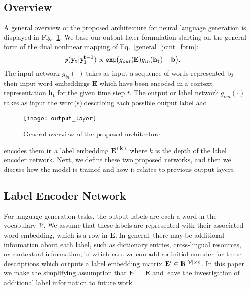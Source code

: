 \documentclass{article}
\begin{document}
\subsection{Overview}
A general overview of the proposed architecture for neural language generation is displayed in Fig.~\ref{drill_schema}.
We base our output layer formulation starting on the general form of the dual nonlinear mapping of Eq.~\ref{general_joint_form}:
\begin{align}
    p(\bf y_t |y_1^{t-1})  & \propto \texttt{exp}\big( g_{out}(\mathbf{E}) g_{in}(\mathbf{h_t}) + \mathbf{b}\big). 
    \label{drill_form}
\end{align} 
The input network $g_{in}(\cdot)$  takes as input a sequence of words represented by their input word embeddings $\mathbf{E}$ which have been encoded in a context representation $\mathbf{h_t}$ for the given time step $t$.  The output or label network  $g_{out}(\cdot)$ takes as input the word(s) describing each possible output label and \begin{figure}[htp]
 	\centering
 	\hspace{5mm}\texttt{[image: output\_layer]}
 	\vspace{-3mm}
 	\caption{General overview of the proposed architecture.}
 	\vspace{-2mm}
 	\label{drill_schema}
\end{figure} encodes them in a label embedding $\mathbf{E^{(k)}}$ where $k$ is the depth of the label encoder network. Next, we define these two proposed networks, and then we discuss how the model is trained and how it relates to previous output layers.
 
\subsection{Label Encoder Network}
 
For language generation tasks, the output labels are each a word in the vocabulary $\mathcal{V}$.  We assume that these labels are represented with their associated word embedding, which is a row in $\mathbf{E}$.  In general, there may be additional information about each label, such as dictionary entries, cross-lingual resources, or contextual information, in which case we can add an initial encoder for these descriptions which outputs a label embedding matrix $\mathbf{E'} \in \rm I\!R^{|\mathcal{V}|\times d}$.  In this paper we make the simplifying assumption that $\mathbf{E'} = \mathbf{E}$ and leave the investigation of additional label information to future work.
\end{document}
